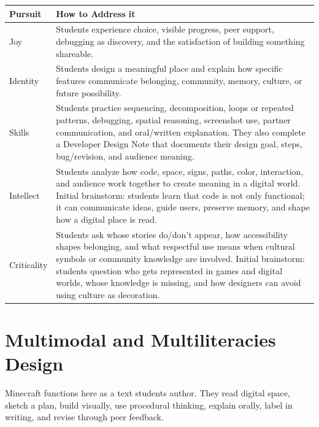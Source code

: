 \renewcommand{\arraystretch}{1.08}
\setlength{\tabcolsep}{3pt}
\begin{tabularx}{\textwidth}{|>{\raggedright\arraybackslash}p{}|Y|}
\hline
{}
\textbf{Pursuit} & \textbf{How to Address it} \\ \hline
{}
Joy & Students experience choice, visible progress, peer support, debugging as discovery, and the satisfaction of building something shareable. \\ \hline
{}
Identity & Students design a meaningful place and explain how specific features communicate belonging, community, memory, culture, or future possibility. \\ \hline
{}
Skills & Students practice sequencing, decomposition, loops or repeated patterns, debugging, spatial reasoning, screenshot use, partner communication, and oral/written explanation. \textcolor{LessonTwoAccent}{They also complete a Developer Design Note that documents their design goal, steps, bug/revision, and audience meaning.} \\ \hline
{}
Intellect & Students analyze how code, space, signs, paths, color, interaction, and audience work together to create meaning in a digital world. \textcolor{LessonTwoAccent}{Initial brainstorm: students learn that code is not only functional; it can communicate ideas, guide users, preserve memory, and shape how a digital place is read.} \\ \hline
{}
Criticality & Students ask whose stories do/don't appear, how accessibility shapes belonging, and what respectful use means when cultural symbols or community knowledge are involved. \textcolor{LessonTwoAccent}{Initial brainstorm: students question who gets represented in games and digital worlds, whose knowledge is missing, and how designers can avoid using culture as decoration.} \\ \hline
\end{tabularx}

\section*{Multimodal and Multiliteracies Design}

Minecraft functions here as a text students author. They read digital space, sketch a plan, build visually, use procedural thinking, explain orally, label in writing, and revise through peer feedback.

